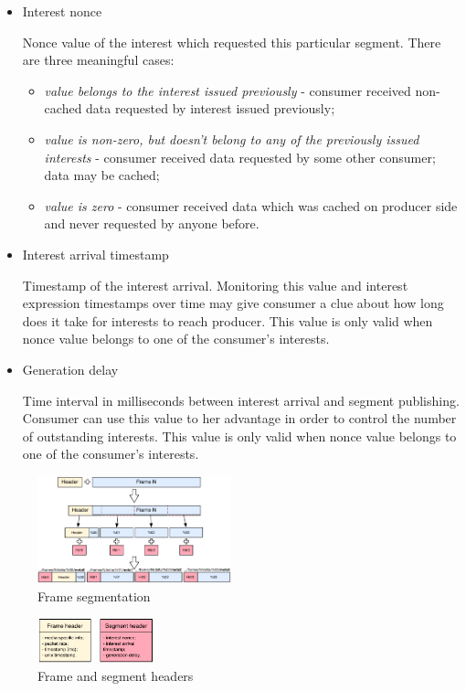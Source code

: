 \documentclass[10pt]{proc}
\begin{document}
\begin{itemize}
\item Interest nonce

Nonce value of the interest which requested this particular segment. There are three meaningful cases: 
\begin{itemize}
\item \textit{value belongs to the interest issued previously} - consumer received non-cached data requested by interest issued previously;
\item \textit{value is non-zero, but doesn't belong to any of the previously issued interests} - consumer received data requested by some other consumer; data may be cached;
\item \textit{value is zero} - consumer received data which was cached on producer side and never requested by anyone before.
\end{itemize}

\item Interest arrival timestamp

Timestamp of the interest arrival. Monitoring this value and interest expression timestamps over time may give consumer a clue about how long does it take for interests to reach producer. This value is only valid when nonce value belongs to one of the consumer's interests.

\item Generation delay

Time interval in milliseconds between interest arrival and segment publishing. Consumer can use this value to her advantage in order to control the number of outstanding interests. This value is only valid when nonce value belongs to one of the consumer's interests.

\end{itemize}

\begin{figure}[Ht!]
\centering
\includegraphics[width=0.5\textwidth]{segmentation}
\caption{Frame segmentation}
\label{fig:segment}
\end{figure}

\begin{figure}[Ht!]
\centering
\includegraphics[width=0.3\textwidth]{data-struct}
\caption{Frame and segment headers}
\label{fig:data-struct}
\end{figure}
\end{document}
